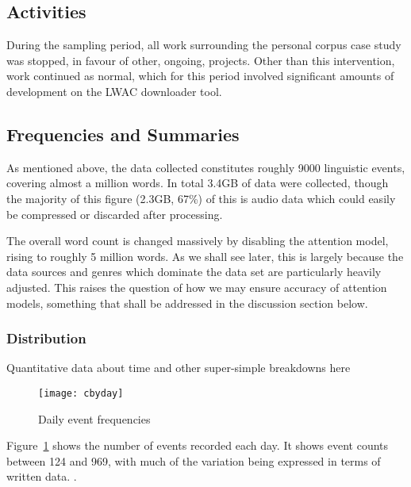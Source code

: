 \subsection{Activities}
During the sampling period, all work surrounding the personal corpus case study was stopped, in favour of other, ongoing, projects.  Other than this intervention, work continued as normal, which for this period involved significant amounts of development on the LWAC downloader tool.










\subsection{Frequencies and Summaries}
As mentioned above, the data collected constitutes roughly 9000 linguistic events, covering almost a million words.  In total 3.4GB of data were collected, though the majority of this figure (2.3GB, 67\%) of this is audio data which could easily be compressed or discarded after processing.

The overall word count is changed massively by disabling the attention model, rising to roughly 5 million words.  As we shall see later, this is largely because the data sources and genres which dominate the data set are particularly heavily adjusted.  This raises the question of how we may ensure accuracy of attention models, something that shall be addressed in the discussion section below.




\subsubsection{Distribution}
Quantitative data about time and other super-simple breakdowns here



\begin{figure}[p]
\centering
\texttt{[image: cbyday]}
\caption{Daily event frequencies}
\label{fig:personal:eventcountbyday}
\end{figure}


Figure~\ref{fig:personal:eventcountbyday} shows the number of events recorded each day.  It shows event counts between 124 and 969, with much of the variation being expressed in terms of written data.  .

